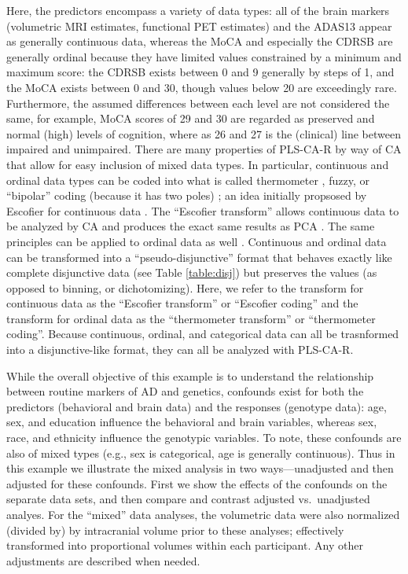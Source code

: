 \documentclass[12pt]{article}
\begin{document}
Here, the predictors encompass a variety of data types: all of the brain
markers (volumetric MRI estimates, functional PET estimates) and the
ADAS13 appear as generally continuous data, whereas the MoCA and
especially the CDRSB are generally ordinal because they have limited
values constrained by a minimum and maximum score: the CDRSB exists
between 0 and 9 generally by steps of 1, and the MoCA exists between 0
and 30, though values below 20 are exceedingly rare. Furthermore, the
assumed differences between each level are not considered the same, for
example, MoCA scores of 29 and 30 are regarded as preserved and normal
(high) levels of cognition, where as 26 and 27 is the (clinical) line
between impaired and unimpaired. There are many properties of PLS-CA-R
by way of CA that allow for easy inclusion of mixed data types. In
particular, continuous and ordinal data types can be coded into what is
called thermometer \citep{beaton2018generalization}, fuzzy, or
``bipolar'' coding (because it has two poles) \citep{greenacrefuzzy}; an
idea initially propsosed by Escofier for continuous data
\citep{escofier_traitement_1979}. The ``Escofier transform'' allows
continuous data to be analyzed by CA and produces the exact same results
as PCA \citep{escofier_traitement_1979}. The same principles can be
applied to ordinal data as well \citep{beaton2018generalization}.
Continuous and ordinal data can be transformed into a
``pseudo-disjunctive'' format that behaves exactly like complete
disjunctive data (see Table \ref{table:disj}) but preserves the values
(as opposed to binning, or dichotomizing). Here, we refer to the
transform for continuous data as the ``Escofier transform'' or
``Escofier coding'' \citep{beaton_partial_2016} and the transform for
ordinal data as the ``thermometer transform'' or ``thermometer coding''.
Because continuous, ordinal, and categorical data can all be trasnformed
into a disjunctive-like format, they can all be analyzed with PLS-CA-R.

While the overall objective of this example is to understand the
relationship between routine markers of AD and genetics, confounds exist
for both the predictors (behavioral and brain data) and the responses
(genotype data): age, sex, and education influence the behavioral and
brain variables, whereas sex, race, and ethnicity influence the
genotypic variables. To note, these confounds are also of mixed types
(e.g., sex is categorical, age is generally continuous). Thus in this
example we illustrate the mixed analysis in two ways---unadjusted and
then adjusted for these confounds. First we show the effects of the
confounds on the separate data sets, and then compare and contrast
adjusted vs.~unadjusted analyes. For the ``mixed'' data analyses, the
volumetric data were also normalized (divided by) by intracranial volume
prior to these analyses; effectively transformed into proportional
volumes within each participant. Any other adjustments are described
when needed.
\end{document}
